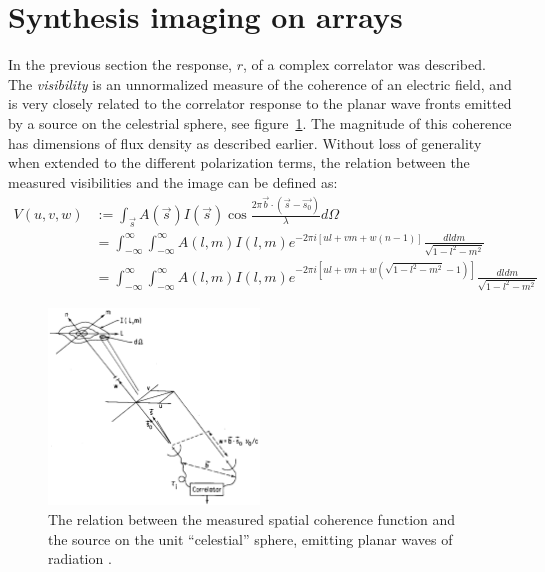 \documentclass[a4paper,10pt]{report}
\begin{document}
\section{Synthesis imaging on arrays}
In the previous section the response, $r$, of a complex correlator was described. The \textit{visibility} is an unnormalized measure of the coherence of an electric field, and is very closely related to the correlator response to the planar wave fronts emitted
by a source on the celestrial sphere, see figure~\ref{fig_uvw_lmn}. The magnitude of this coherence has dimensions of flux density as described earlier. Without loss of generality when extended to the different polarization terms, the relation between the measured visibilities and the 
image can be defined as:
\begin{equation}
 \label{eqn_visibility}
 \begin{split}
  V(u,v,w) &:= \int_{\vec{s}}{A(\vec{s})I(\vec{s})\cos{\frac{2\pi\vec{b}\cdot(\vec{s}-\vec{s_0})}{\lambda}}d\Omega}\\
	   &= \int_{-\infty}^\infty{\int_{-\infty}^\infty{A(l,m)I(l,m)e^{-2\pi i[ul+vm+w(n-1)]} \frac{dldm}{\sqrt{1-l^2-m^2}}}}\\
	   &= \int_{-\infty}^\infty{\int_{-\infty}^\infty{A(l,m)I(l,m)e^{-2\pi i[ul+vm+w(\sqrt{1-l^2-m^2}-1)]} \frac{dldm}{\sqrt{1-l^2-m^2}}}}
 \end{split}
\end{equation}

\begin{figure}[h]
 \begin{mdframed}
 \centering
 \includegraphics[width=0.5\textwidth]{images/lmn_uvw.png}
 \caption[The relation between image space and visibilities]{The relation between the measured spatial coherence function and the source on the unit ``celestial'' sphere, emitting planar waves of radiation \cite{taylor1999synthesis}.}
  \label{fig_uvw_lmn}
 \end{mdframed}
\end{figure}
\end{document}
